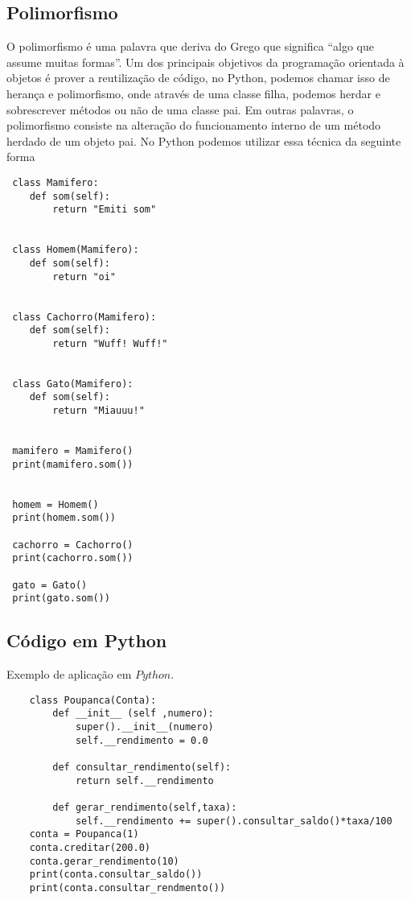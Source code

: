 \documentclass[11pt,a4paper]{article}
\begin{document}
\subsection{Polimorfismo}
O polimorfismo é uma palavra que deriva do Grego que significa “algo que assume muitas formas”\cite{dierbach2012introduction}. Um dos principais objetivos da programação orientada à objetos é prover a reutilização de código, no Python, podemos chamar isso de herança e polimorfismo, onde através de uma classe filha, podemos herdar e sobrescrever métodos ou não
de uma classe pai. Em outras palavras,
o polimorfismo consiste na alteração do funcionamento interno de um método herdado de
um objeto pai. No Python podemos utilizar essa técnica da seguinte forma
\begin{lstlisting}
 class Mamifero:
	def som(self):
		return "Emiti som"
	
	
 class Homem(Mamifero):
	def som(self):
		return "oi"
	
	
 class Cachorro(Mamifero):
	def som(self):
		return "Wuff! Wuff!"
	
	
 class Gato(Mamifero):
	def som(self):
		return "Miauuu!"
	
	
 mamifero = Mamifero()
 print(mamifero.som())
	
	
 homem = Homem()
 print(homem.som())
	
 cachorro = Cachorro()
 print(cachorro.som())
	
 gato = Gato()
 print(gato.som())
\end{lstlisting}




\vspace{0.9in}
\vspace{0.2in}




\newpage
\subsection{Código em Python}

Exemplo de aplicação em $Python$.
\vspace{0.1in}
	
  \begin{lstlisting}
    class Poupanca(Conta):
        def __init__ (self ,numero):
            super().__init__(numero)
            self.__rendimento = 0.0

        def consultar_rendimento(self):
            return self.__rendimento

        def gerar_rendimento(self,taxa):
            self.__rendimento += super().consultar_saldo()*taxa/100
    conta = Poupanca(1)
    conta.creditar(200.0)
    conta.gerar_rendimento(10)
    print(conta.consultar_saldo())
    print(conta.consultar_rendmento())
	\end{lstlisting}
\end{document}
